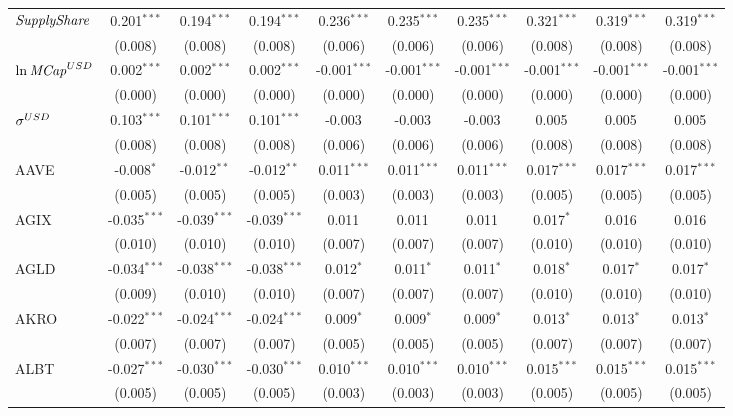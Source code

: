 \begin{table}[!htbp]
\begin{tabular}{@{\extracolsep{5pt}}lccccccccc}
 ${\it SupplyShare}$ & 0.201$^{***}$ & 0.194$^{***}$ & 0.194$^{***}$ & 0.236$^{***}$ & 0.235$^{***}$ & 0.235$^{***}$ & 0.321$^{***}$ & 0.319$^{***}$ & 0.319$^{***}$ \\
  & (0.008) & (0.008) & (0.008) & (0.006) & (0.006) & (0.006) & (0.008) & (0.008) & (0.008) \\
 ${\it \ln MCap}^{USD}$ & 0.002$^{***}$ & 0.002$^{***}$ & 0.002$^{***}$ & -0.001$^{***}$ & -0.001$^{***}$ & -0.001$^{***}$ & -0.001$^{***}$ & -0.001$^{***}$ & -0.001$^{***}$ \\
  & (0.000) & (0.000) & (0.000) & (0.000) & (0.000) & (0.000) & (0.000) & (0.000) & (0.000) \\
 ${\it \sigma}^{USD}$ & 0.103$^{***}$ & 0.101$^{***}$ & 0.101$^{***}$ & -0.003$^{}$ & -0.003$^{}$ & -0.003$^{}$ & 0.005$^{}$ & 0.005$^{}$ & 0.005$^{}$ \\
  & (0.008) & (0.008) & (0.008) & (0.006) & (0.006) & (0.006) & (0.008) & (0.008) & (0.008) \\
 AAVE & -0.008$^{*}$ & -0.012$^{**}$ & -0.012$^{**}$ & 0.011$^{***}$ & 0.011$^{***}$ & 0.011$^{***}$ & 0.017$^{***}$ & 0.017$^{***}$ & 0.017$^{***}$ \\
  & (0.005) & (0.005) & (0.005) & (0.003) & (0.003) & (0.003) & (0.005) & (0.005) & (0.005) \\
 AGIX & -0.035$^{***}$ & -0.039$^{***}$ & -0.039$^{***}$ & 0.011$^{}$ & 0.011$^{}$ & 0.011$^{}$ & 0.017$^{*}$ & 0.016$^{}$ & 0.016$^{}$ \\
  & (0.010) & (0.010) & (0.010) & (0.007) & (0.007) & (0.007) & (0.010) & (0.010) & (0.010) \\
 AGLD & -0.034$^{***}$ & -0.038$^{***}$ & -0.038$^{***}$ & 0.012$^{*}$ & 0.011$^{*}$ & 0.011$^{*}$ & 0.018$^{*}$ & 0.017$^{*}$ & 0.017$^{*}$ \\
  & (0.009) & (0.010) & (0.010) & (0.007) & (0.007) & (0.007) & (0.010) & (0.010) & (0.010) \\
 AKRO & -0.022$^{***}$ & -0.024$^{***}$ & -0.024$^{***}$ & 0.009$^{*}$ & 0.009$^{*}$ & 0.009$^{*}$ & 0.013$^{*}$ & 0.013$^{*}$ & 0.013$^{*}$ \\
  & (0.007) & (0.007) & (0.007) & (0.005) & (0.005) & (0.005) & (0.007) & (0.007) & (0.007) \\
 ALBT & -0.027$^{***}$ & -0.030$^{***}$ & -0.030$^{***}$ & 0.010$^{***}$ & 0.010$^{***}$ & 0.010$^{***}$ & 0.015$^{***}$ & 0.015$^{***}$ & 0.015$^{***}$ \\
  & (0.005) & (0.005) & (0.005) & (0.003) & (0.003) & (0.003) & (0.005) & (0.005) & (0.005) \\

\end{tabular}
\end{table}
